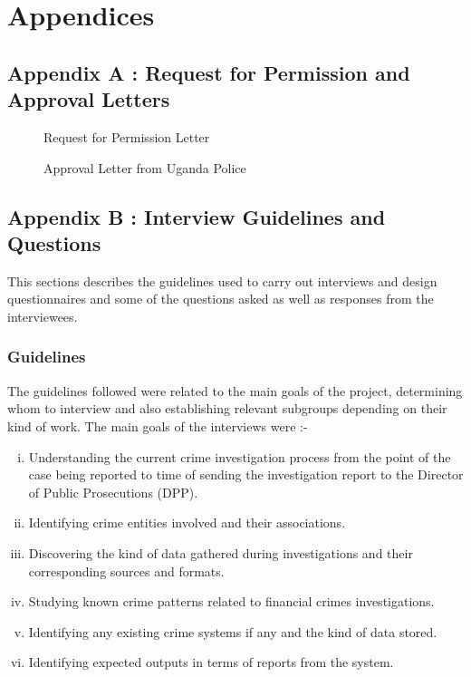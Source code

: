 

\section {Appendices}


\subsection{Appendix A : Request for Permission and Approval Letters}

\begin{center}
\begin{figure}[h]
\caption{Request for Permission Letter}

\end{figure}
\end{center}
\newpage
\begin{center}
\begin{figure}[h]
\caption{Approval Letter from Uganda Police}

\end{figure}
\end{center}


\newpage
\subsection{Appendix B : Interview Guidelines and Questions }

\noindent This sections describes the guidelines used to carry out interviews and design questionnaires and some of the questions asked as well as responses from the interviewees.

\subsubsection{Guidelines}

\noindent The guidelines followed were related to the main goals of the project, determining whom to interview and also establishing relevant subgroups depending on their kind of work. The main goals of the interviews were :-

\begin{enumerate}[(i)]
\item Understanding the current crime investigation process from the point of the case being reported to time of sending the investigation report to the Director of Public Prosecutions (DPP).
\item Identifying crime entities involved and their associations.
\item Discovering the kind of data gathered during investigations and their corresponding sources and formats.
\item Studying known crime patterns related to financial crimes investigations.
\item Identifying any existing crime systems if any and  the kind of data stored.
\item Identifying expected outputs in terms of reports from the system.

\end{enumerate}


